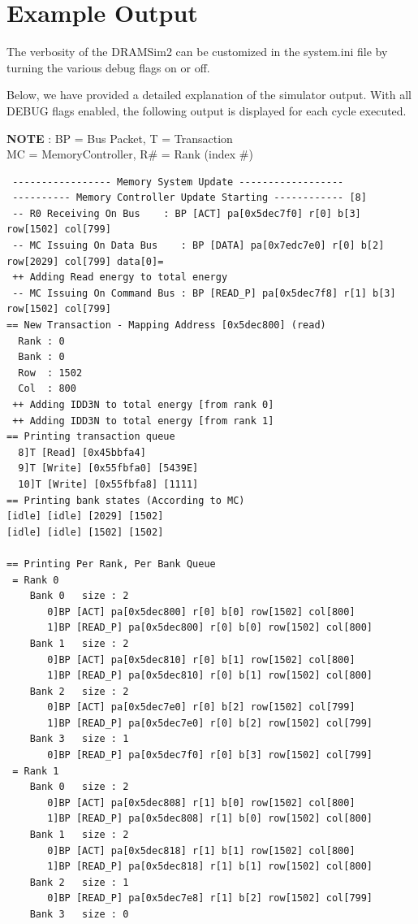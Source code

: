 \documentclass[11pt]{article}
\begin{document}
\section{Example Output}

\noindent\begin{minipage}{\textwidth}
The verbosity of the DRAMSim2 can be customized in the system.ini file by turning the
various debug flags on or off. 

Below, we have provided a detailed explanation of the simulator output.  With
all DEBUG flags enabled, the following output is displayed for each cycle
executed.  

   \textbf{NOTE} : BP = Bus Packet, T  = Transaction \\ 
					MC = MemoryController, R\# = Rank (index \#)
  
\begin{lstlisting}
 ----------------- Memory System Update ------------------
 ---------- Memory Controller Update Starting ------------ [8]
 -- R0 Receiving On Bus    : BP [ACT] pa[0x5dec7f0] r[0] b[3] row[1502] col[799]
 -- MC Issuing On Data Bus    : BP [DATA] pa[0x7edc7e0] r[0] b[2] row[2029] col[799] data[0]=
 ++ Adding Read energy to total energy
 -- MC Issuing On Command Bus : BP [READ_P] pa[0x5dec7f8] r[1] b[3] row[1502] col[799]
== New Transaction - Mapping Address [0x5dec800] (read)
  Rank : 0
  Bank : 0
  Row  : 1502
  Col  : 800
 ++ Adding IDD3N to total energy [from rank 0]
 ++ Adding IDD3N to total energy [from rank 1]
== Printing transaction queue
  8]T [Read] [0x45bbfa4]
  9]T [Write] [0x55fbfa0] [5439E]
  10]T [Write] [0x55fbfa8] [1111]
== Printing bank states (According to MC)
[idle] [idle] [2029] [1502] 
[idle] [idle] [1502] [1502] 

== Printing Per Rank, Per Bank Queue
 = Rank 0
    Bank 0   size : 2
       0]BP [ACT] pa[0x5dec800] r[0] b[0] row[1502] col[800]
       1]BP [READ_P] pa[0x5dec800] r[0] b[0] row[1502] col[800]
    Bank 1   size : 2
       0]BP [ACT] pa[0x5dec810] r[0] b[1] row[1502] col[800]
       1]BP [READ_P] pa[0x5dec810] r[0] b[1] row[1502] col[800]
    Bank 2   size : 2
       0]BP [ACT] pa[0x5dec7e0] r[0] b[2] row[1502] col[799]
       1]BP [READ_P] pa[0x5dec7e0] r[0] b[2] row[1502] col[799]
    Bank 3   size : 1
       0]BP [READ_P] pa[0x5dec7f0] r[0] b[3] row[1502] col[799]
 = Rank 1
    Bank 0   size : 2
       0]BP [ACT] pa[0x5dec808] r[1] b[0] row[1502] col[800]
       1]BP [READ_P] pa[0x5dec808] r[1] b[0] row[1502] col[800]
    Bank 1   size : 2
       0]BP [ACT] pa[0x5dec818] r[1] b[1] row[1502] col[800]
       1]BP [READ_P] pa[0x5dec818] r[1] b[1] row[1502] col[800]
    Bank 2   size : 1
       0]BP [READ_P] pa[0x5dec7e8] r[1] b[2] row[1502] col[799]
    Bank 3   size : 0
\end{lstlisting}
\end{minipage}
\end{document}
